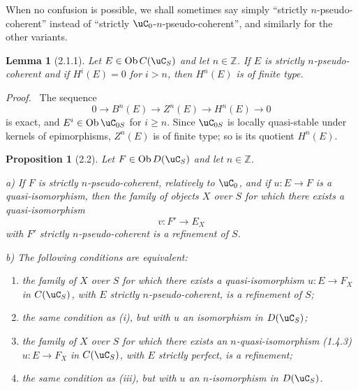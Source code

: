 \documentclass[11pt]{article}
\theoremstyle{plain}
\newtheorem*{proposition*}{Proposition}
\newtheorem*{lemma*}{Lemma}
\theoremstyle{definition}
\theoremstyle{remark}
\newenvironment{prooftext}{\par\noindent\textit{Proof.}\ }{\par\medskip}
\newcommand{\ZZ}{\mathbb Z}
\DeclareMathOperator{\ob}{Ob}
\begin{document}
When no confusion is possible, we shall sometimes say simply ``strictly $n$-pseudo-coherent'' instead of ``strictly $\uC_0$-$n$-pseudo-coherent'', and similarly for the other variants.

\begin{lemma*}[2.1.1]
Let $E\in\ob C(\uC_S)$ and let $n\in\ZZ$. If $E$ is strictly $n$-pseudo-coherent and if $H^i(E)=0$ for $i>n$, then $H^n(E)$ is of finite type.
\end{lemma*}

\begin{prooftext}
The sequence
\[
0\longrightarrow B^n(E)\longrightarrow Z^n(E)\longrightarrow H^n(E)\longrightarrow0
\]
is exact, and $E^i\in\ob\uC_{0S}$ for $i\geq n$. Since $\uC_{0S}$ is locally quasi-stable under kernels of epimorphisms, $Z^n(E)$ is of finite type; so is its quotient $H^n(E)$.
\end{prooftext}

\begin{proposition*}[2.2]
Let $F\in\ob D(\uC_S)$ and let $n\in\ZZ$.

\textup{a)} If $F$ is strictly $n$-pseudo-coherent, relatively to $\uC_0$, and if $u:E\to F$ is a quasi-isomorphism, then the family of objects $X$ over $S$ for which there exists a quasi-isomorphism
\[
v:F'\longrightarrow E_X
\]
with $F'$ strictly $n$-pseudo-coherent is a refinement of $S$.

\textup{b)} The following conditions are equivalent:
\begin{enumerate}[label=(\roman*)]
\item the family of $X$ over $S$ for which there exists a quasi-isomorphism $u:E\to F_X$ in $C(\uC_S)$, with $E$ strictly $n$-pseudo-coherent, is a refinement of $S$;
\item the same condition as (i), but with $u$ an isomorphism in $D(\uC_S)$;
\item the family of $X$ over $S$ for which there exists an $n$-quasi-isomorphism (1.4.3) $u:E\to F_X$ in $C(\uC_S)$, with $E$ strictly perfect, is a refinement;
\item the same condition as (iii), but with $u$ an $n$-isomorphism in $D(\uC_S)$.
\end{enumerate}
\end{proposition*}
\end{document}
